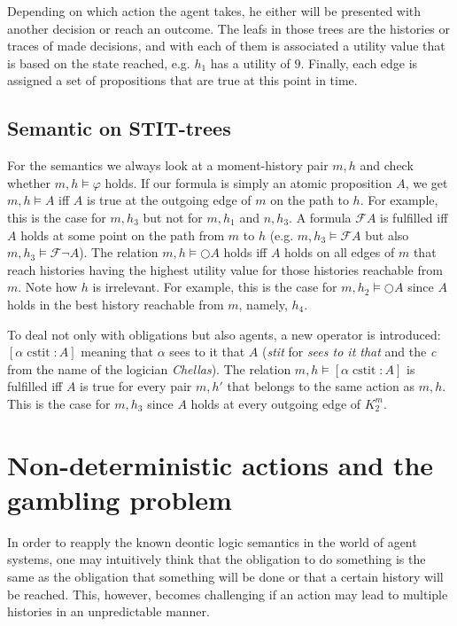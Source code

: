 \documentclass{article}
\newcommand{\cstit}{\operatorname{cstit}}
\begin{document}
Depending on which action the agent takes, he either will be presented with another decision or reach an outcome. The leafs in those trees are the histories or traces of made decisions, and with each of them is associated a utility value that is based on the state reached, e.g. $h_1$ has a utility of $9$. Finally, each edge is assigned a set of propositions that are true at this point in time.

\subsection{Semantic on STIT-trees}
For the semantics we always look at a moment-history pair $m, h$ and check whether $m,h\models \varphi$ holds. If our formula is simply an atomic proposition $A$, we get $m,h\models A$ iff $A$ is true at the outgoing edge of $m$ on the path to $h$. For example, this is the case for $m,h_3$ but not for $m, h_1$ and $n,h_3$. A formula $\mathcal{F} A$ is fulfilled iff $A$ holds at some point on the path from $m$ to $h$ (e.g. $m,h_3\models \mathcal{F} A$ but also $m,h_3\models \mathcal{F} \neg A$). The relation $m,h\models \bigcirc A$ holds iff $A$ holds on all edges of $m$ that reach histories having the highest utility value for those histories reachable from $m$. Note how $h$ is irrelevant. For example, this is the case for $m,h_2\models \bigcirc A$ since $A$ holds in the best history reachable from $m$, namely, $h_4$. 

To deal not only with obligations but also agents, a new operator is introduced: $[\alpha \cstit \colon A]$ meaning that $\alpha$ sees to it that $A$ (\emph{stit} for \emph{sees to it that} and the \emph{c} from the name of the logician \emph{Chellas}). The relation $m,h\models [\alpha \cstit \colon A]$ is fulfilled iff $A$ is true for every pair $m, h'$ that belongs to the same action as $m,h$. This is the case for $m,h_3$ since $A$ holds at every outgoing edge of $K^m_2$.


\section{Non-deterministic actions and the gambling problem}
In order to reapply the known deontic logic semantics in the world of agent systems, one may intuitively think that the obligation to do something is the same as the obligation that something will be done or that a certain history will be reached. This, however, becomes challenging if an action may lead to multiple histories in an unpredictable manner. 
\end{document}
